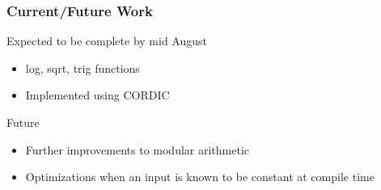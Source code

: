 \documentclass[utf8]{beamer}
\begin{document}
\begin{frame}
  \frametitle{Current/Future Work}
  \begin{block}{Expected to be complete by mid August}
    \begin{itemize}
      \item log, sqrt, trig functions 
      \item Implemented using CORDIC
    \end{itemize}
  \end{block}
  \begin{block}{Future}
    \begin{itemize}
      \item Further improvements to modular arithmetic 
      \item Optimizations when an input is known to be constant at compile time
    \end{itemize}
  \end{block}
\end{frame}
\end{document}
